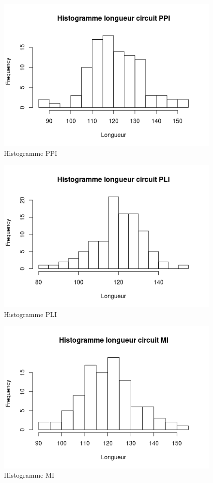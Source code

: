 \documentclass[10pt,a4paper]{article}
\begin{document}
\begin{figure}[!ht]
    \centering
    \includegraphics[width=0.8\linewidth]{img/RplotPPI.png}
    \caption{Histogramme PPI}
    \label{PPIhist}
\end{figure}

\begin{figure}[!ht]
    \centering
    \includegraphics[width=0.8\linewidth]{img/RplotPLI.png}
    \caption{Histogramme PLI}
    \label{PLIhist}
\end{figure}

\begin{figure}[!ht]
    \centering
    \includegraphics[width=0.8\linewidth]{img/RplotMI.png}
    \caption{Histogramme MI}
    \label{MIhist}
\end{figure}
\end{document}
